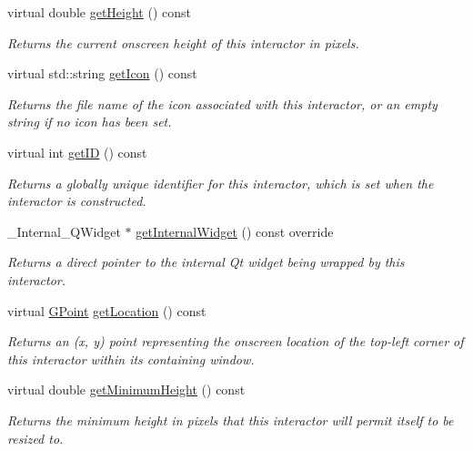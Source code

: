 \begin{DoxyCompactItemize}
virtual double \mbox{\hyperlink{classsgl_1_1GInteractor_a1e7e353362434072875264cf95629f99}{get\+Height}} () const
\begin{DoxyCompactList}\small\item\em Returns the current onscreen height of this interactor in pixels. \end{DoxyCompactList}\item 
virtual std\+::string \mbox{\hyperlink{classsgl_1_1GInteractor_aaed62a73004939a64da6f0eb9eb64d73}{get\+Icon}} () const
\begin{DoxyCompactList}\small\item\em Returns the file name of the icon associated with this interactor, or an empty string if no icon has been set. \end{DoxyCompactList}\item 
virtual int \mbox{\hyperlink{classsgl_1_1GInteractor_a9c9659a6c6ba66b4107ba59c95a24241}{get\+ID}} () const
\begin{DoxyCompactList}\small\item\em Returns a globally unique identifier for this interactor, which is set when the interactor is constructed. \end{DoxyCompactList}\item 
\+\_\+\+Internal\+\_\+\+Q\+Widget $\ast$ \mbox{\hyperlink{classsgl_1_1GTable_a2f6b36b2517087dc90a366b5ce1f5323}{get\+Internal\+Widget}} () const override
\begin{DoxyCompactList}\small\item\em Returns a direct pointer to the internal Qt widget being wrapped by this interactor. \end{DoxyCompactList}\item 
virtual \mbox{\hyperlink{structsgl_1_1GPoint}{G\+Point}} \mbox{\hyperlink{classsgl_1_1GInteractor_a4f83802015511edeb63b892830812c11}{get\+Location}} () const
\begin{DoxyCompactList}\small\item\em Returns an (x, y) point representing the onscreen location of the top-\/left corner of this interactor within its containing window. \end{DoxyCompactList}\item 
virtual double \mbox{\hyperlink{classsgl_1_1GInteractor_aed4b0075fcc434499c3cb3e46896bda3}{get\+Minimum\+Height}} () const
\begin{DoxyCompactList}\small\item\em Returns the minimum height in pixels that this interactor will permit itself to be resized to. \end{DoxyCompactList}\item 

\end{DoxyCompactItemize}
